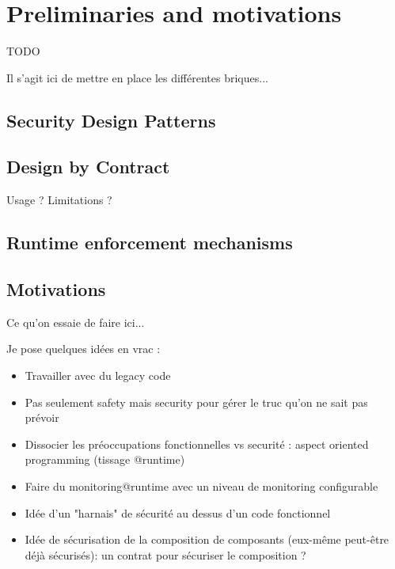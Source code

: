 \section{Preliminaries and motivations}
\label{sec:preliminaries}

TODO

Il s'agit ici de mettre en place les différentes briques...

\subsection{Security Design Patterns}


\subsection{Design by Contract}


Usage ?
Limitations ?

\subsection{Runtime enforcement mechanisms}


\subsection{Motivations} 

Ce qu'on essaie de faire ici...

Je pose quelques idées en vrac :

\begin{itemize}
    \item Travailler avec du legacy code
    \item Pas seulement safety mais security pour gérer le truc qu'on ne sait pas prévoir
    \item Dissocier les préoccupations fonctionnelles vs securité : aspect oriented programming (tissage @runtime)
    \item Faire du monitoring@runtime avec un niveau de monitoring configurable
    \item Idée d'un "harnais" de sécurité au dessus d'un code fonctionnel
    \item Idée de sécurisation de la composition de composants (eux-même peut-être déjà sécurisés): un contrat pour sécuriser le composition ?
\end{itemize}





